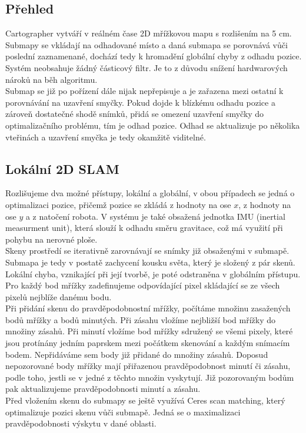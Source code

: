 \documentclass[11pt]{article}
\begin{document}
\subsection{Přehled}
Cartographer vytváří v reálném čase 2D mřížkovou mapu s rozlišením na 5 cm. Submapy se vkládají na odhadované místo a daná submapa se porovnává vůči poslední zaznamenané, dochází tedy k hromadění globální chyby z odhadu pozice. Systém neobsahuje žádný částicový filtr. Je to z důvodu snížení hardwarových nároků na běh algoritmu.\\
\indent Submap se již po pořízení dále nijak nepřepisuje a je zařazena mezi ostatní k porovnávání na uzavření smyčky. Pokud dojde k blízkému odhadu pozice a zároveň dostatečné shodě snímků, přidá se omezení uzavření smyčky do optimalizačního problému, tím je odhad pozice. Odhad se aktualizuje po několika vteřinách a uzavření smyčka je tedy okamžitě viditelné. 

\subsection{Lokální 2D SLAM}
Rozlišujeme dva možné přístupy, lokální a globální, v obou případech se jedná o optimalizaci pozice, přičemž pozice se zkládá z hodnoty na ose $x$, z hodnoty na ose $y$ a z natočení robota. V systému je také obsažená jednotka IMU (inertial measurment unit), která slouží k odhadu směru gravitace, což má využití při pohybu na nerovné ploše.\\
\indent Skeny prostředí se iterativně zarovnávají se snímky již obsaženými v submapě. Submapa je tedy v postatě zachycení kousku světa, který je složený z pár skenů. Lokální chyba, vznikající při její tvorbě, je poté odstraněna v globálním přístupu. Pro každý bod mřížky zadefinujeme odpovídající pixel skládající se ze všech pixelů nejblíže danému bodu.\\
\indent Při přidání skenu do pravděpodobnostní mřížky, počítáme množinu zasažených bodů mřížky a bodů minutých. Při zásahu vložíme nejbližší bod mřížky do množiny zásahů. Při minutí vložíme bod mřížky sdružený se všemi pixely, které jsou protínány jedním paprskem mezi počátkem skenování a každým snímacím bodem. Nepřidáváme sem body již přidané do množiny zásahů. Doposud nepozorované body mřížky mají přiřazenou pravděpodobnost minutí či zásahu, podle toho, jestli se v jedné z těchto množin vyskytují. Již pozorovaným bodům pak aktualizujeme pravděpodobnosti minutí a zásahu.\\
\indent Před vložením skenu do submapy se ještě využívá Ceres scan matching, který optimalizuje pozici skenu vůči submapě. Jedná se o maximalizaci pravděpodobnosti výskytu v dané oblasti.  
\end{document}
